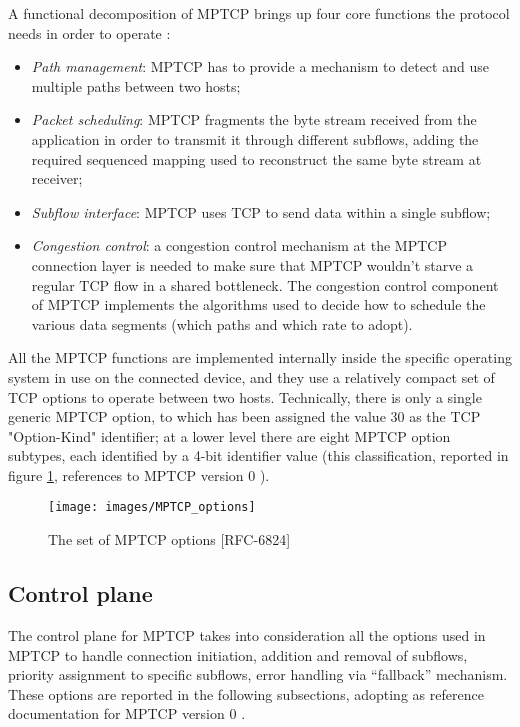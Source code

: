 A functional decomposition of MPTCP brings up four core functions the protocol needs in order to operate \cite{rfc6182}:
\begin{itemize}
  \item \textit{Path management}: MPTCP has to provide a mechanism to detect and use multiple paths between two hosts;
  \item \textit{Packet scheduling}: MPTCP fragments the byte stream received from the application in order to transmit it through different subflows, adding the required sequenced mapping used to reconstruct the same byte stream at receiver;
  \item \textit{Subflow interface}: MPTCP uses TCP to send data within a single subflow;
  \item \textit{Congestion control}: a congestion control mechanism at the MPTCP connection layer is needed to make sure that MPTCP wouldn't starve a regular TCP flow in a shared bottleneck. The congestion control component of MPTCP implements the algorithms used to decide how to schedule the various data segments (which paths and which rate to adopt).
  \end{itemize}

All the MPTCP functions are implemented internally inside the specific operating system in use on the connected device, and they use a relatively compact set of TCP options to operate between two hosts. Technically, there is only a single generic MPTCP option, to which has been assigned the value 30 as the TCP "Option-Kind" identifier; at a lower level there are eight MPTCP option subtypes, each identified by a 4-bit identifier value (this classification, reported in figure \ref{fig:MPTCP_options}, references to MPTCP version 0 \cite{rfc6824}).

\begin{figure}[!htb]
\centering
\texttt{[image: images/MPTCP\_options]}
\caption{The set of MPTCP options [RFC-6824]}
\label{fig:MPTCP_options}
\end{figure}

\subsection{Control plane}
The control plane for MPTCP takes into consideration all the options used in MPTCP to handle connection initiation, addition and removal of subflows, priority assignment to specific subflows, error handling via ``fallback'' mechanism. These options are reported in the following subsections, adopting as reference documentation for MPTCP version 0 \cite{rfc6824}.

